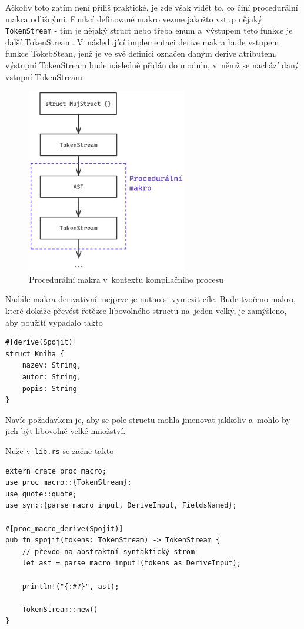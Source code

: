 \documentclass[a4paper, 12pt, twoside]{article} %
\newcommand{\rust}[1]{\texttt{#1}}
\begin{document}
			Ačkoliv toto zatím není příliš praktické, je zde však vidět to, co činí procedurální makra odlišnými. Funkcí definované makro vezme jakožto vstup nějaký \rust{TokenStream} - tím je nějaký struct nebo třeba enum a~výstupem této funkce je další TokenStream. V~následující implementaci derive makra bude vstupem funkce TokebStean, jenž je ve své definici označen daným derive atributem, výstupní TokenStream bude následně přidán do modulu, v~němž se nachází daný vstupní TokenStream.
			\begin{center}
				\begin{figure}[H]
					\centering
					\includegraphics[width=7cm]{proc}
					\caption{Procedurální makra v~kontextu kompilačního procesu}
					\label{fig:proc}
				\end{figure}
			\end{center}
			
			Nadále makra derivativní: nejprve je nutno si vymezit cíle. Bude tvořeno makro, které dokáže převést řetězce libovolného structu na~jeden velký, je zamýšleno, aby použití vypadalo takto
			\begin{verbatim}
#[derive(Spojit)]
struct Kniha {
	nazev: String,
	autor: String,
	popis: String
}
			\end{verbatim}

			Navíc požadavkem je, aby se pole structu mohla jmenovat jakkoliv a~mohlo by jich být libovolně velké množství.

			Nuže v~\texttt{lib.rs} se začne takto
			\begin{verbatim}
extern crate proc_macro;
use proc_macro::{TokenStream};
use quote::quote;
use syn::{parse_macro_input, DeriveInput, FieldsNamed};

#[proc_macro_derive(Spojit)]
pub fn spojit(tokens: TokenStream) -> TokenStream {
	// převod na abstraktní syntaktický strom
	let ast = parse_macro_input!(tokens as DeriveInput);
	
	println!("{:#?}", ast);

	TokenStream::new()
}
			\end{verbatim}
			
\end{document}
